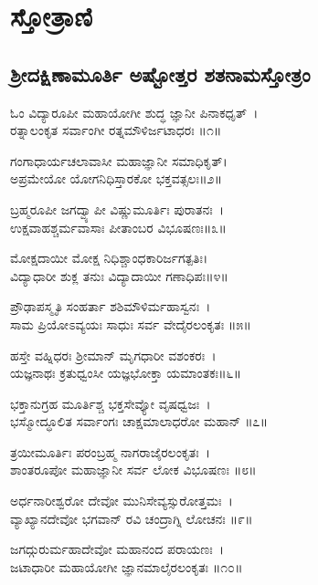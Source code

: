 \chapter*{\center ಸ್ತೋತ್ರಾಣಿ}
\thispagestyle{empty}
\section{ಶ್ರೀದಕ್ಷಿಣಾಮೂರ್ತಿ ಅಷ್ಟೋತ್ತರ ಶತನಾಮಸ್ತೋತ್ರಂ }

ಓಂ ವಿದ್ಯಾರೂಪೀ ಮಹಾಯೋಗೀ ಶುದ್ಧ ಜ್ಞಾನೀ ಪಿನಾಕಧೃತ್~।\\
ರತ್ನಾಲಂಕೃತ ಸರ್ವಾಂಗೀ ರತ್ನಮೌಳಿರ್ಜಟಾಧರಃ ॥೧॥

ಗಂಗಾಧಾರ್ಯಚಲಾವಾಸೀ ಮಹಾಜ್ಞಾನೀ ಸಮಾಧಿಕೃತ್।\\
ಅಪ್ರಮೇಯೋ ಯೋಗನಿಧಿಸ್ತಾರಕೋ ಭಕ್ತವತ್ಸಲಃ॥೨॥

ಬ್ರಹ್ಮರೂಪೀ ಜಗದ್ವ್ಯಾಪೀ ವಿಷ್ಣುಮೂರ್ತಿಃ ಪುರಾತನಃ~।\\
ಉಕ್ಷವಾಹಶ್ಚರ್ಮವಾಸಾಃ ಪೀತಾಂಬರ ವಿಭೂಷಣಃ॥೩॥

ಮೋಕ್ಷದಾಯೀ ಮೋಕ್ಷ ನಿಧಿಶ್ಚಾಂಧಕಾರಿರ್ಜಗತ್ಪತಿಃ।\\
ವಿದ್ಯಾಧಾರೀ ಶುಕ್ಲ ತನುಃ ವಿದ್ಯಾದಾಯೀ ಗಣಾಧಿಪಃ॥೪॥

ಪ್ರೌಢಾಪಸ್ಮೃತಿ ಸಂಹರ್ತಾ ಶಶಿಮೌಳಿರ್ಮಹಾಸ್ವನಃ~।\\
ಸಾಮ ಪ್ರಿಯೋಽವ್ಯಯಃ ಸಾಧುಃ ಸರ್ವ ವೇದೈರಲಂಕೃತಃ ॥೫॥

ಹಸ್ತೇ ವಹ್ನಿಧರಃ ಶ್ರೀಮಾನ್ ಮೃಗಧಾರೀ ವಶಂಕರಃ~।\\
ಯಜ್ಞನಾಥಃ ಕ್ರತುಧ್ವಂಸೀ ಯಜ್ಞಭೋಕ್ತಾ ಯಮಾಂತಕಃ॥೬॥

ಭಕ್ತಾನುಗ್ರಹ ಮೂರ್ತಿಶ್ಚ ಭಕ್ತಸೇವ್ಯೋ ವೃಷಧ್ವಜಃ~।\\
ಭಸ್ಮೋದ್ಧೂಲಿತ ಸರ್ವಾಂಗಃ ಚಾಕ್ಷಮಾಲಾಧರೋ ಮಹಾನ್ ॥೭॥

ತ್ರಯೀಮೂರ್ತಿಃ ಪರಂಬ್ರಹ್ಮ ನಾಗರಾಜೈರಲಂಕೃತಃ~।\\
ಶಾಂತರೂಪೋ ಮಹಾಜ್ಞಾನೀ ಸರ್ವ ಲೋಕ ವಿಭೂಷಣಃ ॥೮॥

ಅರ್ಧನಾರೀಶ್ವರೋ ದೇವೋ ಮುನಿಸೇವ್ಯಸ್ಸುರೋತ್ತಮಃ~।\\
ವ್ಯಾಖ್ಯಾನದೇವೋ ಭಗವಾನ್ ರವಿ ಚಂದ್ರಾಗ್ನಿ ಲೋಚನಃ ॥೯॥

ಜಗದ್ಗುರುರ್ಮಹಾದೇವೋ ಮಹಾನಂದ ಪರಾಯಣಃ~।\\
ಜಟಾಧಾರೀ ಮಹಾಯೋಗೀ ಜ್ಞಾನಮಾಲೈರಲಂಕೃತಃ ॥೧೦॥

